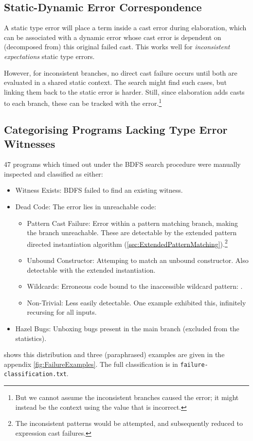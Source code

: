 \subsection{Static-Dynamic Error Correspondence}
\label{sec:ErrorCorrespondence}

A static type error will place a term inside a cast error during elaboration, which can be associated with a dynamic error whose cast error is dependent on (decomposed from) this original failed cast. This works well for \textit{inconsistent expectations} static type errors.

However, for inconsistent branches, no direct cast failure occurs until both are evaluated in a shared static context. The search might find such cases, but linking them back to the static error is harder. Still, since elaboration adds casts to each branch, these can be tracked with the error.\footnote{But we cannot assume the inconsistent branches caused the error; it might instead be the context using the value that is incorrect.}
  
\subsection{Categorising Programs Lacking Type Error Witnesses}
47 programs which timed out under the BDFS search procedure were manually inspected and classified as either:
\begin{itemize}
\item Witness Exists: BDFS failed to find an existing witness.
\item Dead Code: The error lies in unreachable code:
\begin{itemize}
\item Pattern Cast Failure: Error within a pattern matching branch, making the branch unreachable. These are detectable by the extended pattern directed instantiation algorithm (\cref{sec:ExtendedPatternMatching}).\footnote{The inconsistent patterns would be attempted, and subsequently reduced to expression cast failures.}
\item Unbound Constructor: Attemping to match an unbound constructor. Also detectable with the extended instantiation.
\item Wildcards: Erroneous code bound to the inaccessible wildcard pattern: .
\item Non-Trivial: Less easily detectable. One example exhibited this, infinitely recursing for all inputs.
\end{itemize}
\item Hazel Bugs: Unboxing bugs present in the main branch (excluded from the statistics).
\end{itemize}
 shows this distribution and three (paraphrased) examples are given in the appendix \cref{fig:FailureExamples}. The full classification is in \texttt{failure-classification.txt}.

